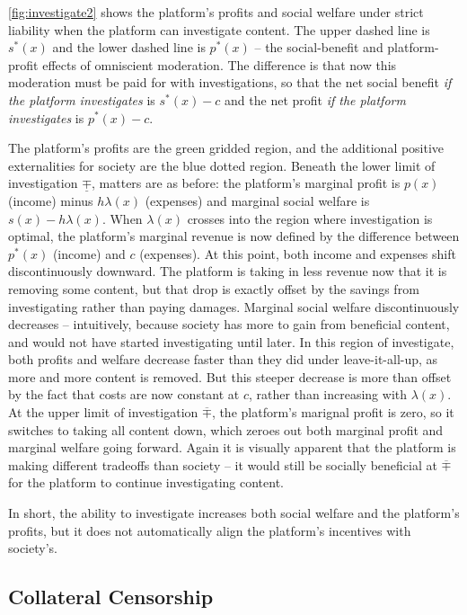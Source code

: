 \autoref{fig:investigate2} shows the platform's profits and social welfare under strict liability when the platform can investigate content. The upper dashed line is $s^*(x)$ and the lower dashed line is $p^*(x)$ -- the social-benefit and platform-profit effects of omniscient moderation. The difference is that now this moderation must be paid for with investigations, so that the net social benefit \emph{if the platform investigates} is $s^*(x) - c$ and the net profit \emph{if the platform investigates} is $p^*(x) - c$. 

The platform's profits are the green gridded region, and the additional positive externalities for society are the blue dotted region. Beneath the lower limit of investigation $\underline{\mp}$, matters are as before: the platform's marginal profit is $p(x)$ (income) minus $h\lambda(x)$ (expenses) and marginal social welfare is $s(x) - h\lambda(x)$. When $\lambda(x)$ crosses into the region where investigation is optimal, the platform's marginal revenue is now defined by the difference between $p^*(x)$ (income) and $c$ (expenses). At this point, both income and expenses shift discontinuously downward. The platform is taking in less revenue now that it is removing some content, but that drop is exactly offset by the savings from investigating rather than paying damages. Marginal social welfare discontinuously decreases -- intuitively, because society has more to gain from beneficial content, and would not have started investigating until later. In this region of investigate, both profits and welfare decrease faster than they did under leave-it-all-up, as more and more content is removed. But this steeper decrease is more than offset by the fact that costs are now constant at $c$, rather than increasing with $\lambda(x)$. At the upper limit of investigation $\overline{\mp}$, the platform's marignal profit is zero, so it switches to taking all content down, which zeroes out both marginal profit and marginal welfare going forward. Again it is visually apparent that the platform is making different tradeoffs than society -- it would still be socially beneficial at $\overline{\mp}$ for the platform to continue investigating content.

In short, the ability to investigate increases both social welfare and the platform's profits, but it does not automatically align the platform's incentives with society's.

\subsection{Collateral Censorship}

